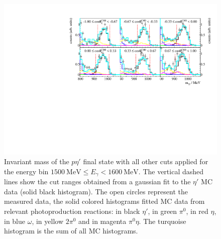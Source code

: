 \begin{figure}[htbp]
 	\centering
 	\includegraphics[width=\linewidth]{../figs/hydrogen/bin_cuts/invcut_ebin1.pdf}
 	\caption{Invariant mass of the $p\eta'$ final state with all other cuts applied for the energy bin $\SI{1500}{\mega\eV}\leq E_\gamma<\SI{1600}{\mega\eV}$. The vertical dashed lines show the cut ranges obtained from a gaussian fit to the $\eta'$ MC data (solid black histogram). The open circles represent the measured data, the solid colored histograms fitted MC data from relevant photoproduction reactions: in black $\eta'$, in green $\pi^0$, in red $\eta$, in blue $\omega$, in yellow $2\pi^0$ and in magenta $\pi^0\eta$. The turquoise histogram is the sum of all MC histograms.}
 	\label{fig:invm}
\end{figure}
